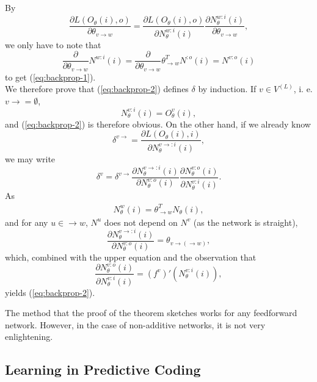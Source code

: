 \documentclass[a4paper,11pt]{report}
\begin{document}
\begin{Bew}
By
\[
\frac{\partial L(O_{\theta}(i),o)}{\partial\theta_{v\to w}}=\frac{\partial L(O_{\theta}(i),o)}{\partial N_{\theta}^{w:i}(i)}\frac{\partial N_{\theta}^{w:i}(i)}{\partial\theta_{v\to w}},
\]
we only have to note that
\[
\frac{\partial}{\partial\theta_{v\to w}}N^{w:i}(i)=\frac{\partial}{\partial\theta_{v\to w}}\theta^T_{\to w}N^{:o}(i)=N^{v:o}(i)
\]
to get (\ref{eq:backprop-1}).\\
We therefore prove that (\ref{eq:backprop-2}) defines $\delta$ by induction. If $v\in V^{(L)}$, i. e. $v\to=\emptyset$,
\[
N^{v:i}_{\theta}(i)=O^v_{\theta}(i),
\]
and (\ref{eq:backprop-2}) is therefore obvious. On the other hand, if we already know
\[
\delta^{v\to}=\frac{\partial L(O_{\theta}(i),i)}{\partial N^{v\to:i}_{\theta}(i)},
\]
we may write
\[
\delta^v=\delta^{v\to}\frac{\partial N^{v\to:i}_{\theta}(i)}{\partial N^{v:o}_{\theta}(i)}\frac{\partial N^{v:o}_{\theta}(i)}{\partial N^{v:i}_{\theta}(i)}.
\]
As
\begin{align*}
N^w_{\theta}(i)=\theta_{\to w}^TN_{\theta}(i),
\end{align*}
and for any $u\in\to w$, $N^u$ does not depend on $N^v$ (as the network is straight), 
\[
\frac{\partial N^{v\to:i}_{\theta}(i)}{\partial N^{v:o}_{\theta}(i)}=\theta_{v\to(\to w)},
\]
which, combined with the upper equation and the observation that
\[
\frac{\partial N^{v:o}_{\theta}(i)}{\partial N^{v:i}_{\theta}(i)}=\left(f^v\right)'(N^{v:i}_{\theta}(i)),
\]
yields (\ref{eq:backprop-2}).
\end{Bew}

\begin{Par}
The method that the proof of the theorem sketches works for any feedforward network. However, in the case of non-additive networks, it is not very enlightening.
\end{Par}

\subsection{Learning in Predictive Coding}\label{subsec:theory-learning-predicode}
\end{document}
